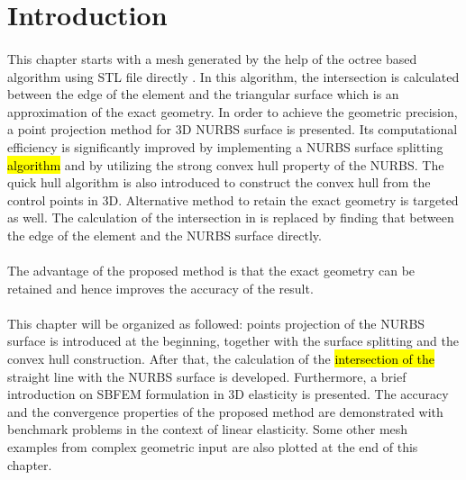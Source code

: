 \section{Introduction}
\paragraph{}
This chapter starts with a mesh generated by the help of the octree based algorithm using STL file directly \citep{Liu2017}.
In this algorithm, the intersection is calculated between the edge of the element and the triangular surface which is an approximation of the exact geometry.
In order to achieve the geometric precision, a point projection method for 3D NURBS surface is presented.
Its computational efficiency is significantly improved by implementing a NURBS surface splitting \hl{algorithm} and by utilizing the strong convex hull property of the NURBS.
The quick hull algorithm is also introduced to construct the convex hull from the control points in 3D.
Alternative method to retain the exact geometry is targeted as well.
The calculation of the intersection in \cite{Liu2017} is replaced by finding that between the edge of the element and the NURBS surface directly.

\paragraph{}
The advantage of the proposed method is that the exact geometry can be retained and hence improves the accuracy of the result.

\paragraph{}
This chapter will be organized as followed:
points projection of the NURBS surface is introduced at the beginning, together with the surface splitting and the convex hull construction.
After that, the calculation of the \hl{intersection of the} straight line with the NURBS surface is developed.
Furthermore, a brief introduction on SBFEM formulation in 3D elasticity is presented.
The accuracy and the convergence properties of the proposed method are demonstrated with benchmark problems in the context of linear elasticity.
Some other mesh examples from complex geometric input are also plotted at the end of this chapter.